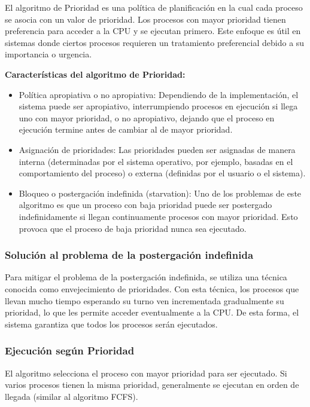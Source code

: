 El algoritmo de Prioridad es una política de planificación en la cual cada proceso se asocia con un valor de prioridad. Los procesos con mayor prioridad tienen preferencia para acceder a la CPU y se ejecutan primero. Este enfoque es útil en sistemas donde ciertos procesos requieren un tratamiento preferencial debido a su importancia o urgencia.

\textbf{Características del algoritmo de Prioridad:} 
\begin{itemize} 
	\item Política apropiativa o no apropiativa: Dependiendo de la implementación, el sistema puede ser apropiativo, interrumpiendo procesos en ejecución si llega uno con mayor prioridad, o no apropiativo, dejando que el proceso en ejecución termine antes de cambiar al de mayor prioridad. 
	\item Asignación de prioridades: Las prioridades pueden ser asignadas de manera interna (determinadas por el sistema operativo, por ejemplo, basadas en el comportamiento del proceso) o externa (definidas por el usuario o el sistema). 
	\item Bloqueo o postergación indefinida (starvation): Uno de los problemas de este algoritmo es que un proceso con baja prioridad puede ser postergado indefinidamente si llegan continuamente procesos con mayor prioridad. Esto provoca que el proceso de baja prioridad nunca sea ejecutado.
\end{itemize}

\subsubsection{Solución al problema de la postergación indefinida}

Para mitigar el problema de la postergación indefinida, se utiliza una técnica conocida como envejecimiento de prioridades. Con esta técnica, los procesos que llevan mucho tiempo esperando su turno ven incrementada gradualmente su prioridad, lo que les permite acceder eventualmente a la CPU. De esta forma, el sistema garantiza que todos los procesos serán ejecutados.

\subsubsection{Ejecución según Prioridad}

El algoritmo selecciona el proceso con mayor prioridad para ser ejecutado. Si varios procesos tienen la misma prioridad, generalmente se ejecutan en orden de llegada (similar al algoritmo FCFS).

